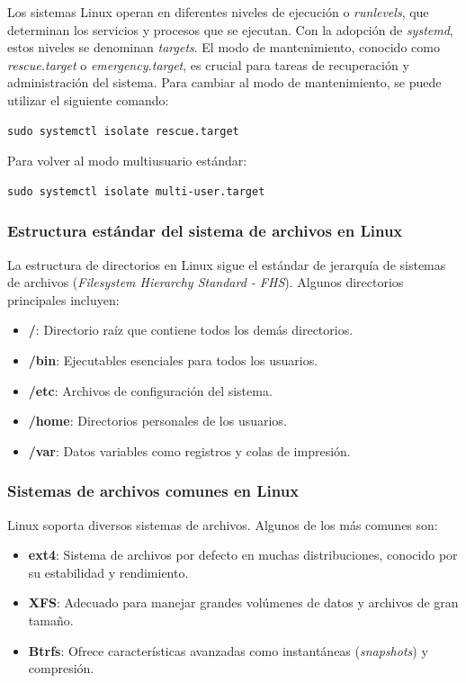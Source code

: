 Los sistemas Linux operan en diferentes niveles de ejecución o \textit{runlevels}, que determinan los servicios y procesos que se ejecutan. Con la adopción de \textit{systemd}, estos niveles se denominan \textit{targets}. El modo de mantenimiento, conocido como \textit{rescue.target} o \textit{emergency.target}, es crucial para tareas de recuperación y administración del sistema. Para cambiar al modo de mantenimiento, se puede utilizar el siguiente comando:

\begin{lstlisting}[style=mystyle]
sudo systemctl isolate rescue.target
\end{lstlisting}

Para volver al modo multiusuario estándar:

\begin{lstlisting}[style=mystyle]
sudo systemctl isolate multi-user.target
\end{lstlisting}

\subsubsection{Estructura estándar del sistema de archivos en Linux}

La estructura de directorios en Linux sigue el estándar de jerarquía de sistemas de archivos (\textit{Filesystem Hierarchy Standard - FHS}). Algunos directorios principales incluyen:

\begin{itemize}
  \item \textbf{/}: Directorio raíz que contiene todos los demás directorios.
  \item \textbf{/bin}: Ejecutables esenciales para todos los usuarios.
  \item \textbf{/etc}: Archivos de configuración del sistema.
  \item \textbf{/home}: Directorios personales de los usuarios.
  \item \textbf{/var}: Datos variables como registros y colas de impresión.
\end{itemize}

\subsubsection{Sistemas de archivos comunes en Linux}

Linux soporta diversos sistemas de archivos. Algunos de los más comunes son:

\begin{itemize}
  \item \textbf{ext4}: Sistema de archivos por defecto en muchas distribuciones, conocido por su estabilidad y rendimiento.
  \item \textbf{XFS}: Adecuado para manejar grandes volúmenes de datos y archivos de gran tamaño.
  \item \textbf{Btrfs}: Ofrece características avanzadas como instantáneas (\textit{snapshots}) y compresión.
\end{itemize}

